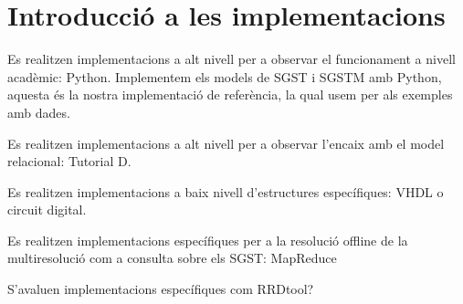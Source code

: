 

\chapter{Introducció a les implementacions}


Es realitzen implementacions a alt nivell per a observar el funcionament a nivell acadèmic: Python. Implementem els models de SGST i SGSTM amb Python, aquesta és la nostra implementació de referència, la qual usem per als exemples amb dades.

Es realitzen implementacions a alt nivell per a observar l'encaix amb el model relacional: Tutorial D.

Es realitzen implementacions a baix nivell d'estructures específiques: VHDL o circuit digital.


Es realitzen implementacions específiques per a la resolució offline de la multiresolució com a consulta sobre els SGST: MapReduce


S'avaluen implementacions específiques com RRDtool?

























